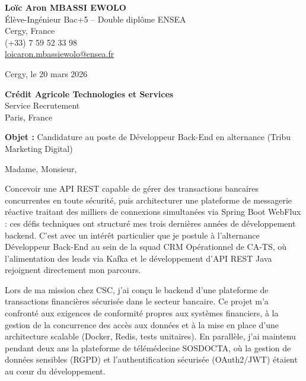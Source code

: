 \documentclass[a4paper,11pt]{article}
\begin{document}
\noindent
\begin{minipage}[t]{0.5\textwidth}
    \textbf{Loïc Aron MBASSI EWOLO}\\
    Élève-Ingénieur Bac+5 -- Double diplôme ENSEA\\[3pt]
    Cergy, France\\
    (+33) 7 59 52 33 98\\
    \href{mailto:loicaron.mbassiewolo@ensea.fr}{loicaron.mbassiewolo@ensea.fr}
\end{minipage}
\hfill
\begin{minipage}[t]{0.4\textwidth}
    \raggedleft
    Cergy, le 20 mars 2026
\end{minipage}

\vspace{1.2cm}

\hfill
\begin{minipage}[t]{0.5\textwidth}
    \raggedleft
    \textbf{Crédit Agricole Technologies et Services}\\
    Service Recrutement\\
    Paris, France
\end{minipage}

\vspace{1cm}

\noindent\textbf{Objet :} Candidature au poste de Développeur Back-End en alternance (Tribu Marketing Digital)

\vspace{0.8cm}

Madame, Monsieur,

Concevoir une API REST capable de gérer des transactions bancaires concurrentes en toute sécurité, puis architecturer une plateforme de messagerie réactive traitant des milliers de connexions simultanées via Spring Boot WebFlux : ces défis techniques ont structuré mes trois dernières années de développement backend. C'est avec un intérêt particulier que je postule à l'alternance Développeur Back-End au sein de la squad CRM Opérationnel de CA-TS, où l'alimentation des leads via Kafka et le développement d'API REST Java rejoignent directement mon parcours.

Lors de ma mission chez CSC, j'ai conçu le backend d'une plateforme de transactions financières sécurisée dans le secteur bancaire. Ce projet m'a confronté aux exigences de conformité propres aux systèmes financiers, à la gestion de la concurrence des accès aux données et à la mise en place d'une architecture scalable (Docker, Redis, tests unitaires). En parallèle, j'ai maintenu pendant deux ans la plateforme de télémédecine SOSDOCTA, où la gestion de données sensibles (RGPD) et l'authentification sécurisée (OAuth2/JWT) étaient au c\oe ur du développement.
\end{document}
